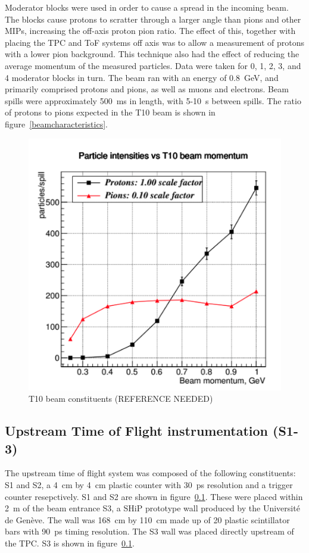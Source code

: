     Moderator blocks were used in order to cause a spread in the incoming beam.
    The blocks cause protons to scratter through a larger angle than pions and other MIPs, increasing the off-axis proton pion ratio.
    The effect of this, together with placing the TPC and ToF systems off axis was to allow a measurement of protons with a lower pion background.
    This technique also had the effect of reducing the average momentum of the measured particles.
    Data were taken for 0, 1, 2, 3, and 4 moderator blocks in turn.
    The beam ran with an energy of 0.8~GeV, and primarily comprised protons and pions, as well as muons and electrons. 
    Beam spills were approximately 500~ms in length, with 5-10~s between spills.
    The ratio of protons to pions expected in the T10 beam  is shown in figure~\ref{beamcharacteristics}.
      \begin{figure}
      \centering
    \includegraphics[width=0.6\linewidth]{files/Figures/offaxismeasurement.png}
    	\caption{T10 beam constituents (REFERENCE NEEDED)}
    		\label{fig:beamcharacteristics}
    \end{figure}
    
    
	\subsection{Upstream Time of Flight instrumentation (S1-3)}
    The upstream time of flight system was composed of the following constituents:
    S1 and S2, a 4~cm by 4~cm plastic counter with 30~ps resolution and a trigger counter resepctively.
    S1 and S2 are shown in figure~\ref{}.
    These were placed within 2~m of the beam entrance
    S3, a SHiP prototype wall produced by the Université de Genève. 
    The wall was 168~cm by 110~cm made up of 20 plastic scintillator bars with 90~ps timing resolution.
    The S3 wall was placed directly upstream of the TPC.
    S3 is shown in figure~\ref{}.

